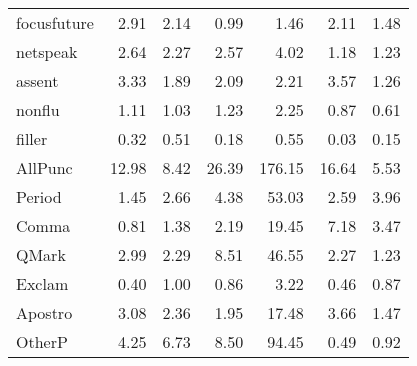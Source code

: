 \begin{longtable}{@{}p{3.4cm}rrrrrr@{}}
focusfuture & 2.91 & 2.14 & 0.99 & 1.46 & 2.11 & 1.48 \\
netspeak & 2.64 & 2.27 & 2.57 & 4.02 & 1.18 & 1.23 \\
assent & 3.33 & 1.89 & 2.09 & 2.21 & 3.57 & 1.26 \\
nonflu & 1.11 & 1.03 & 1.23 & 2.25 & 0.87 & 0.61 \\
filler & 0.32 & 0.51 & 0.18 & 0.55 & 0.03 & 0.15 \\
AllPunc & 12.98 & 8.42 & 26.39 & 176.15 & 16.64 & 5.53 \\
Period & 1.45 & 2.66 & 4.38 & 53.03 & 2.59 & 3.96 \\
Comma & 0.81 & 1.38 & 2.19 & 19.45 & 7.18 & 3.47 \\
QMark & 2.99 & 2.29 & 8.51 & 46.55 & 2.27 & 1.23 \\
Exclam & 0.40 & 1.00 & 0.86 & 3.22 & 0.46 & 0.87 \\
Apostro & 3.08 & 2.36 & 1.95 & 17.48 & 3.66 & 1.47 \\
OtherP & 4.25 & 6.73 & 8.50 & 94.45 & 0.49 & 0.92 \\
\end{longtable}
\endgroup
